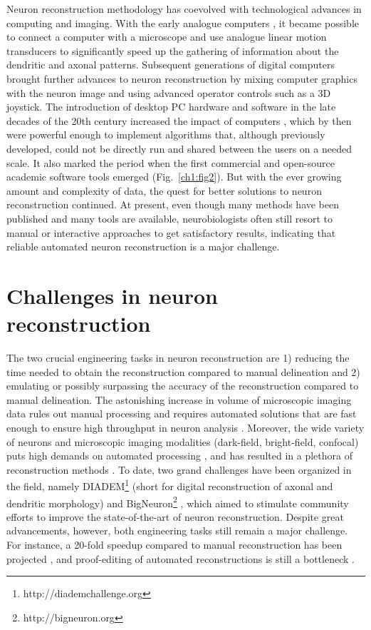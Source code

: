 Neuron reconstruction methodology has coevolved with technological advances in computing and imaging. With the early analogue computers \cite{glaser1965semi}, it became possible to connect a computer with a microscope and use analogue linear motion transducers to significantly speed up the gathering of information about the dendritic and axonal patterns. Subsequent generations of digital computers \cite{capowski1981accurate, capowski1977computer} brought further advances to neuron reconstruction by mixing computer graphics with the neuron image and using advanced operator controls such as a 3D joystick. The introduction of desktop PC hardware and software in the late decades of the 20th century increased the impact of computers \cite{halavi2012digital}, which by then were powerful enough to implement algorithms that, although previously developed, could not be directly run and shared between the users on a needed scale. It also marked the period when the first commercial and open-source academic software tools emerged (Fig.~\ref{ch1:fig2}). But with the ever growing amount and complexity of data, the quest for better solutions to neuron reconstruction continued. At present, even though many methods have been published and many tools are available, neurobiologists often still resort to manual or interactive approaches to get satisfactory results, indicating that reliable automated neuron reconstruction is a major challenge.

\section{Challenges in neuron reconstruction}
\label{sec:capturing-neuron}
The two crucial engineering tasks in neuron reconstruction are 1) reducing the time needed to obtain the reconstruction compared to manual delineation and 2) emulating or possibly surpassing the accuracy of the reconstruction compared to manual delineation. The astonishing increase in volume of microscopic imaging data rules out manual processing \cite{meijering2016imagining} and requires automated solutions that are fast enough to ensure high throughput in neuron analysis \cite{peng2017automatic}. Moreover, the wide variety of neurons and microscopic imaging modalities (dark-field, bright-field, confocal) puts high demands on automated processing \cite{svoboda2011past, peng2011proof}, and has resulted in a plethora of reconstruction methods \cite{peng2011automatic}. To date, two grand challenges have been organized in the field, namely DIADEM\footnote{http://diademchallenge.org} (short for digital reconstruction of axonal and dendritic morphology) and BigNeuron\footnote{http://bigneuron.org} \cite{peng2015diadem, peng2015bigneuron, gillette2011diademchallenge}, which aimed to stimulate community efforts to improve the state-of-the-art of neuron reconstruction. Despite great advancements, however, both engineering tasks still remain a major challenge. For instance, a 20-fold speedup compared to manual reconstruction has been projected \cite{liu2011diadem}, and proof-editing of automated reconstructions is still a bottleneck \cite{peng2011proof}.

